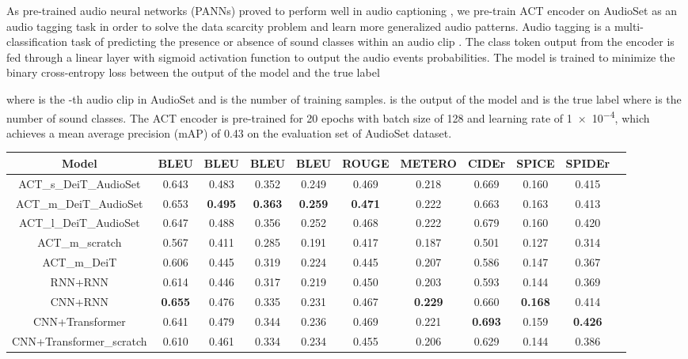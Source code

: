 \documentclass{article}
\begin{document}
\begin{sloppy}
As pre-trained audio neural networks (PANNs) proved to perform well in audio captioning \cite{xinhao2021_t6}, we pre-train ACT encoder on AudioSet as an audio tagging task in order to solve the data scarcity problem and learn more generalized audio patterns. Audio tagging is a multi-classification task of predicting the presence or absence of sound classes within an audio clip \cite{kong2019weakly}. The class token output from the encoder is fed through a linear layer with sigmoid activation function to output the audio events probabilities. The model is trained to minimize the binary cross-entropy loss between the output of the model and the true label

where  is the -th audio clip in AudioSet and  is the number of training samples.  is the output of the model and  is the true label where  is the number of sound classes. The ACT encoder is pre-trained for \num{20} epochs with batch size of \num{128} and learning rate of \num{1e-4}, which achieves a mean average precision (mAP) of \num{0.43} on the evaluation set of AudioSet dataset. 
\begin{table*}[ht]
\centering
\begin{tabular}[\linewidth]{c c c c c c c c c c c} 
 \hline
 Model & BLEU & BLEU & BLEU & BLEU & ROUGE & METERO & CIDEr & SPICE & SPIDEr \\ 
 \hline
 ACT\_s\_DeiT\_AudioSet & 0.643 & 0.483 & 0.352 & 0.249 & 0.469 & 0.218 & 0.669 & 0.160 & 0.415 \\
 ACT\_m\_DeiT\_AudioSet & 0.653 & \textbf{0.495} & \textbf{0.363} & \textbf{0.259} & \textbf{0.471} & 0.222 & 0.663 & 0.163 & 0.413 \\
 ACT\_l\_DeiT\_AudioSet & 0.647 & 0.488 & 0.356 & 0.252 & 0.468 & 0.222 & 0.679 & 0.160 & 0.420 \\
 \hline
 ACT\_m\_scratch & 0.567 & 0.411 & 0.285 & 0.191 & 0.417 & 0.187 & 0.501 & 0.127 & 0.314 \\
 ACT\_m\_DeiT & 0.606 & 0.445 & 0.319 & 0.224 & 0.445 & 0.207 & 0.586 & 0.147 & 0.367 \\
\hline
 RNN+RNN \cite{kim2019audiocaps} & 0.614 & 0.446 & 0.317 & 0.219 & 0.450 & 0.203 & 0.593 & 0.144 & 0.369 \\
 CNN+RNN \cite{xu2021investigating} & \textbf{0.655} & 0.476 & 0.335 & 0.231 & 0.467 & \textbf{0.229} & 0.660 & \textbf{0.168} & 0.414 \\
 CNN+Transformer \cite{xinhao2021_t6} & 0.641 & 0.479 & 0.344 & 0.236 & 0.469 & 0.221 & \textbf{0.693} & 0.159 & \textbf{0.426} \\
 CNN+Transformer\_scratch \cite{xinhao2021_t6} & 0.610 & 0.461 & 0.334 & 0.234 & 0.455 & 0.206 & 0.629 & 0.144 & 0.386 \\
 \hline
\end{tabular}


\end{table*}
\end{sloppy}
\end{document}
